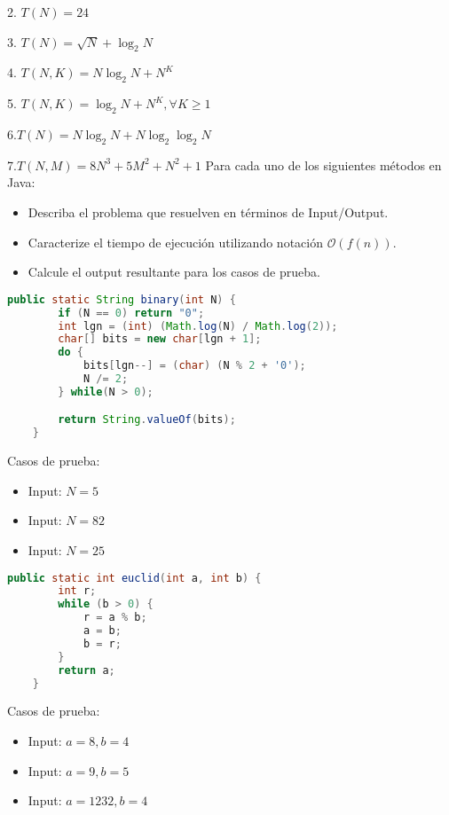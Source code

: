\documentclass[12pt]{article}
\begin{document}
2. $T(N) = 24$
\newline\hspace{0.5cm}

3. $T(N) = \sqrt{N} + \log_2 N$
\newline\hspace{0.5cm}

4. $T(N, K) = N \log_2 N + N ^ K$
\newline\hspace{0.5cm}

5. $T(N, K) = \log_2 N + N ^ K,  \forall K \geq 1$
\newline\hspace{0.5cm}

6.$T(N) = N \log_2 N + N \log_2 \log_2 N$
\newline\hspace{0.5cm}

7.$T(N, M) = 8 N^3 + 5 M^2 + N^2 + 1$
\newpage
{}
Para cada uno de los siguientes métodos en Java:
\begin{itemize}
    \item Describa el problema que resuelven en términos de Input/Output.
    \item Caracterize el tiempo de ejecución utilizando notación $\mathcal{O}(f(n))$.
    \item Calcule el output resultante para los casos de prueba.
\end{itemize}
\begin{lstlisting}[language=Java]
    public static String binary(int N) {
        if (N == 0) return "0";
        int lgn = (int) (Math.log(N) / Math.log(2));
        char[] bits = new char[lgn + 1];
        do {
            bits[lgn--] = (char) (N % 2 + '0');
            N /= 2;
        } while(N > 0);

        return String.valueOf(bits);
    }
\end{lstlisting}
Casos de prueba:
\begin{itemize}
    \item Input: $N = 5$
    \item Input: $N = 82$
    \item Input: $N = 25$
\end{itemize}

\begin{lstlisting}[language=Java]
    public static int euclid(int a, int b) {
        int r;
        while (b > 0) {
            r = a % b;
            a = b;
            b = r;
        }
        return a;
    }
\end{lstlisting}
Casos de prueba:
\begin{itemize}
    \item Input: $a = 8, b = 4$
    \item Input: $a = 9, b = 5$
    \item Input: $a = 1232, b = 4$
\end{itemize}
\end{document}

